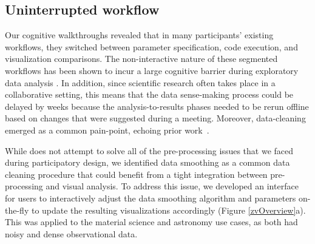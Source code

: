 \subsection{Uninterrupted workflow}
\par Our cognitive walkthroughs revealed that in many participants' existing workflows, they switched between parameter specification, code execution, and visualization comparisons. The non-interactive nature of these segmented workflows has been shown to incur a large cognitive barrier during exploratory data analysis \cite{Kery2017}. In addition, since scientific research often takes place in a collaborative setting, this means that the data sense-making process could be delayed by weeks because the analysis-to-results phases needed to be rerun offline based on changes that were suggested during a meeting. Moreover, data-cleaning emerged as a common pain-point, echoing prior work~\cite{kandel2011wrangler,Kandel2012}.


 While \zv does not attempt to solve all of the pre-processing issues that we faced during participatory design, we identified data smoothing as a common data cleaning procedure that could benefit from a tight integration between pre-processing and visual analysis. 
\npar To address this issue, we developed an interface for users to interactively adjust the data smoothing algorithm and parameters on-the-fly to update the resulting visualizations accordingly (Figure \ref{zvOverview}a). This was applied to the material science and astronomy use cases, as both had noisy and dense observational data. 

